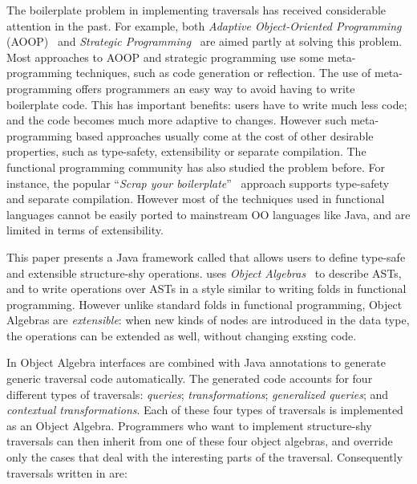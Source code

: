 The boilerplate problem in implementing traversals has received
considerable attention in the past. For example, both \emph{Adaptive
  Object-Oriented Programming} (AOOP)~\cite{DemeterBook} and
\emph{Strategic Programming}~\cite{borovansky1996elan,visser1998core}
are aimed partly at solving this problem. Most approaches to AOOP and
strategic programming use some meta-programming techniques, such as
code generation or reflection. The use of meta-programming offers
programmers an easy way to avoid having to write boilerplate code.
This has important benefits: users have to write much less code; and 
the code becomes much more adaptive to changes.
However such meta-programming based approaches usually come at the cost of
other desirable properties, such as type-safety, extensibility or
separate compilation. The functional programming community has also
studied the problem before. For instance, the popular ``\emph{Scrap your
boilerplate}''~\cite{ralf03syb} approach supports type-safety and
separate compilation. However most of the techniques used in
functional languages cannot be easily ported to mainstream OO
languages like Java, and are limited in terms of extensibility.



This paper presents a Java framework called \name that allows users to
define type-safe and extensible structure-shy operations. \name
uses \emph{Object Algebras}~\cite{bruno12oa} to describe ASTs, and to
write operations over ASTs in a style similar to writing folds in
functional programming. However unlike standard folds in
functional programming, Object Algebras are
\emph{extensible}: when new kinds of nodes are introduced in the data type, the operations can be extended as well, without changing exsting code. 

In \name Object Algebra interfaces are combined
with Java annotations to generate generic traversal code automatically. The
generated code accounts for four different types of traversals:
\emph{queries}; \emph{transformations}; \emph{generalized queries};
and \emph{contextual transformations}.  Each of these four types of
traversals is implemented as an Object Algebra. Programmers who want
to implement structure-shy traversals can then inherit from one of these
four object algebras, and override only the cases that deal with 
the interesting parts of the traversal. Consequently
traversals written in \name are:

